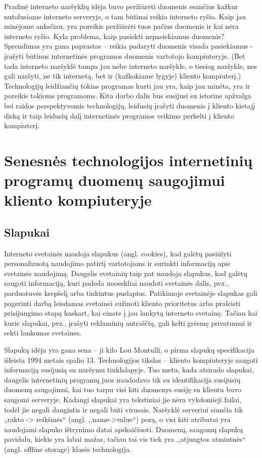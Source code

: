 \documentclass[12pt,a4paper,titlepage]{article}
\begin{document}
Pradinė interneto naršyklių idėja buvo peržiūrėti duomenis esančius kažkur nutolusiame interneto serveryje, o tam būtinai reikia interneto ryšio. Kaip jau minėjome anksčiau, yra poreikis peržiūrėti tuos pačius duomenis ir kai nėra interneto ryšio. Kyla problema, kaip pasiekti nepasiekiamus duomenis? Sprendimas yra gana paprastas – reikia padaryti duomenis visada pasiekiamus - įrašyti būtinus internetinės programos duomenis vartotojo kompiuteryje. (Bet tada interneto naršyklė tampa jau nebe interneto naršykle, o tiesiog naršykle, nes gali naršyti, ne tik internetą, bet ir (kažkokiame lygyje) kliento kompiuterį.) Technologijų leidžiančių tokias programas kurti jau yra, kaip jau minėta, yra ir poreikis tokioms programoms. Kita darbo dalis bus susijusi su istorine apžvalga bei raidos perspektyvomis technologijų, leidusių įrašyti duomenis į kliento kietajį diską ir taip leidusių dalį internetinės programos veikimo perkelti į kliento kompiuterį. 

\section{Senesnės technologijos internetinių programų duomenų saugojimui kliento kompiuteryje}

\subsection{Slapukai}

Interneto svetainės naudoja slapukus (angl. cookies), kad galėtų pasiūlyti personalizuotą naudojimo patirtį vartotojams ir surinkti informaciją apie svetainės naudojimą. Daugelis svetainių taip pat naudoja slapukus, kad galėtų saugoti informaciją, kuri padeda nuosekliai naudoti svetainės dalis, pvz., parduotuvės krepšelį arba tinkintus puslapius. Patikimoje svetainėje slapukas gali pagerinti darbą leisdamas svetainei sužinoti kliento prioritetus arba praleisti prisijungimo etapą kaskart, kai einate į jau lankytą interneto svetainę. Tačiau kai kurie slapukai, pvz., įrašyti reklaminių antraščių, gali kelti grėsmę privatumui ir sekti lankomas svetaines.

Slapukų idėja yra gana sena – ji kilo Lou Montulli, o  pirma slapukų specifikacija išleista 1994 metais spalio 13. Technologijos tikslas – kliento kompiuteryje saugoti informaciją susijusią su naršymu tinklalapyje. Tuo metu, kada atsirado slapukai, daugelis internetinių programų juos naudodavo tik su identifikacija susijusių duomenų saugojimui, kai tuo tarpu visi kiti duomenys susiję su klientu buvo saugomi serveryje. Kadangi slapukai yra tekstiniai jie nėra vykdomieji failai, todėl jie negali daugintis ir negali būti virusais. Naršyklė serveriui siunčia tik „rakto -> reikšmės“ (angl. ,,name->value``) porą, o visi kiti atributai yra naudojami slapuko ištrynimo datai apskaičiuoti. Duomenų, saugomų slapukų pavidalu, kiekis yra labai mažas, tačiau tai vis tiek yra ,,atjungtos atmintnės`` (angl. offline storage) klasės technologija.
\end{document}

